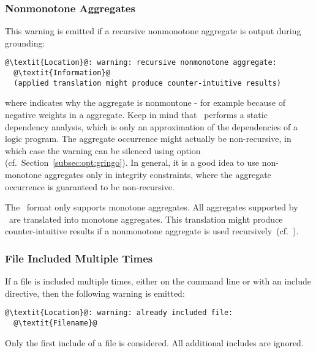 \subsubsection{Nonmonotone Aggregates}\label{sec:warn:nonmon}
This warning is emitted if a recursive nonmonotone aggregate is output during grounding:
\begin{lstlisting}[numbers=none,escapechar=@]
@\textit{Location}@: warning: recursive nonmonotone aggregate:
  @\textit{Information}@
  (applied translation might produce counter-intuitive results)
\end{lstlisting}
where  indicates why the aggregate is nonmontone
- for example because of negative weights in a  aggregate.
Keep in mind that \gringo\ performs a static dependency analysis,
which is only an approximation of the dependencies of a logic program.
The aggregate occurrence might actually be non-recursive,
in which case the warning can be silenced using option  (cf.~Section~\ref{subsec:opt:gringo}).
In general, it is a good idea to use non-monotone aggregates only in integrity constraints,
where the aggregate occurrence is guaranteed to be non-recursive.

\begin{note}
The \smodels\ format only supports monotone aggregates.
All aggregates supported by \gringo\ are translated into monotone aggregates.
This translation might produce counter-intuitive results
if a nonmonotone aggregate is used recursively~(cf.~\cite{ferlif05a}).
\end{note}

\subsubsection{File Included Multiple Times}\label{sec:warn:incfile}
If a file is included multiple times,
either on the command line or with an include directive,
then the following warning is emitted:
\begin{lstlisting}[numbers=none,escapechar=@]
@\textit{Location}@: warning: already included file:
  @\textit{Filename}@
\end{lstlisting}


\begin{note}
Only the first include of a file is considered.
All additional includes are ignored.
\end{note}
